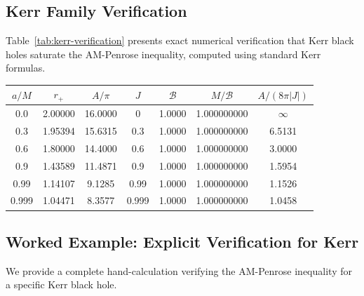 \documentclass[12pt]{article}
\theoremstyle{plain}
\theoremstyle{definition}
\theoremstyle{remark}
\begin{document}
\subsection{Kerr Family Verification}

Table~\ref{tab:kerr-verification} presents exact numerical verification that Kerr black holes saturate the AM-Penrose inequality, computed using standard Kerr formulas.

\begin{center}
\begin{tabular}{@{}ccccccc@{}}
\toprule
$a/M$ & $r_+$ & $A/\pi$ & $J$ & $\mathcal{B}$ & $M/\mathcal{B}$ & $A/(8\pi|J|)$ \\
\midrule
0.0 & 2.00000 & 16.0000 & 0 & 1.0000 & 1.000000000 & $\infty$ \\
0.3 & 1.95394 & 15.6315 & 0.3 & 1.0000 & 1.000000000 & 6.5131 \\
0.6 & 1.80000 & 14.4000 & 0.6 & 1.0000 & 1.000000000 & 3.0000 \\
0.9 & 1.43589 & 11.4871 & 0.9 & 1.0000 & 1.000000000 & 1.5954 \\
0.99 & 1.14107 & 9.1285 & 0.99 & 1.0000 & 1.000000000 & 1.1526 \\
0.999 & 1.04471 & 8.3577 & 0.999 & 1.0000 & 1.000000000 & 1.0458 \\
\bottomrule
\end{tabular}
\label{tab:kerr-verification}
\end{center}

\subsection{Worked Example: Explicit Verification for Kerr}

We provide a complete hand-calculation verifying the AM-Penrose inequality for a specific Kerr black hole.
\end{document}
